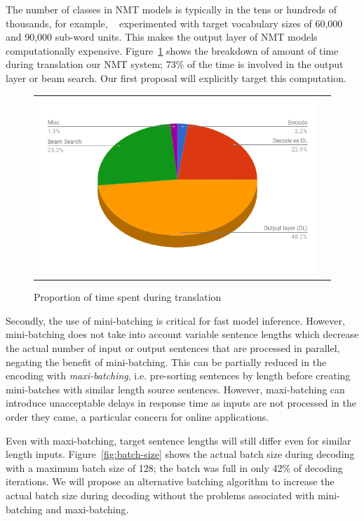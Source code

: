 \documentclass[11pt,a4paper]{article}
\begin{document}
The number of classes in NMT models is typically in the tens or hundreds of thousands, for example, ~\citet{sennrich-haddow-birch:2016:P16-12} experimented with target vocabulary sizes of 60,000 and 90,000 sub-word units. This makes the output layer of NMT models computationally expensive. Figure~\ref{fig:pie-time-opensubtitles} shows the breakdown of amount of time during translation our NMT system; 73\% of the time is involved in the output layer or beam search. Our first proposal will explicitly target this computation.
\begin{figure}[h]
\centering
\begin{tabular}{cc}
{\includegraphics[scale=0.3]{pie-time-opensubtitles.png}} 
\end{tabular}
\caption{Proportion of time spent during translation}
\label{fig:pie-time-opensubtitles}
\end{figure} 

Secondly, the use of mini-batching is critical for fast model inference. However, mini-batching does not take into account variable sentence lengths which decrease the actual number of input or output sentences that are processed in parallel, negating the benefit of mini-batching. This can be partially reduced in the encoding with \emph{maxi-batching}, i.e. pre-sorting sentences by length before creating mini-batches with similar length source sentences. However, maxi-batching can introduce unacceptable delays in response time as inputs are not processed in the order they came, a particular concern for online applications. 

Even with maxi-batching, target sentence lengths will still differ even for similar length inputs. Figure~\ref{fig:batch-size} shows the actual batch size during decoding with a maximum batch size of 128; the batch was full in only 42\% of decoding iterations. We will propose an alternative batching algorithm to increase the actual batch size during decoding without the problems associated with mini-batching and maxi-batching.
\end{document}
